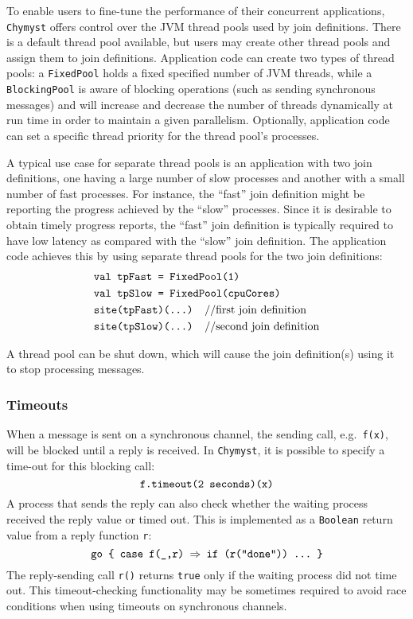 \documentclass[sigplan,10pt,review,anonymous]{acmart}\settopmatter{printfolios=true}
\begin{document}
To enable users to fine-tune the performance of their concurrent applications,
\texttt{Chymyst} offers control over the JVM thread pools used by
join definitions. There is a default thread pool available, but users
may create other thread pools and assign them to join definitions.
Application code can create two types of thread pools: a \texttt{FixedPool}
holds a fixed specified number of JVM threads, while a \texttt{BlockingPool}
is aware of blocking operations (such as sending synchronous messages)
and will increase and decrease the number of threads dynamically at
run time in order to maintain a given parallelism. Optionally, application
code can set a specific thread priority for the thread pool's processes.

A typical use case for separate thread pools is an application with
two join definitions, one having a large number of slow processes
and another with a small number of fast processes. For instance, the
``fast'' join definition might be reporting the progress achieved
by the ``slow'' processes. Since it is desirable to obtain timely
progress reports, the ``fast'' join definition is typically required
to have low latency as compared with the ``slow'' join definition.
The application code achieves this by using separate thread pools
for the two join definitions:
\begin{align*}
 & \text{\texttt{val tpFast = FixedPool(1)}}\\
 & \text{\texttt{val tpSlow = FixedPool(cpuCores)}}\\
 & \text{\texttt{site(tpFast)(...) \textnormal{//first join definition}}}\\
 & \text{\texttt{site(tpSlow)(...) \textnormal{//second join definition}}}
\end{align*}

A thread pool can be shut down, which will cause the join definition(s)
using it to stop processing messages.

\subsubsection{Timeouts}

When a message is sent on a synchronous channel, the sending call,
e.g.~\texttt{f(x)}, will be blocked until a reply is received. In
\texttt{Chymyst}, it is possible to specify a time-out for this blocking
call: 
\[
\text{\texttt{f.timeout(2 seconds)(x)}}
\]
A process that sends the reply can also check whether the waiting
process received the reply value or timed out. This is implemented
as a \texttt{Boolean} return value from a reply function \texttt{r}:
\[
\text{\texttt{go \{ case f(\_,r) \ensuremath{\Rightarrow} if (r("done")) ...~\}}}
\]
The reply-sending call \texttt{r()} returns \texttt{true} only if
the waiting process did not time out. This timeout-checking functionality
may be sometimes required to avoid race conditions when using timeouts
on synchronous channels.
\end{document}
